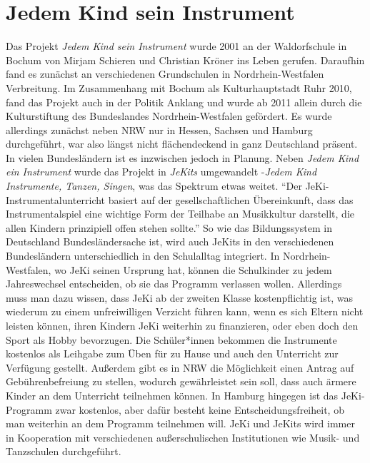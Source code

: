 \section{Jedem Kind sein Instrument}

Das Projekt \emph{Jedem Kind sein Instrument} wurde 2001 an der Waldorfschule in
Bochum von Mirjam Schieren und Christian Kröner ins Leben gerufen. Daraufhin
fand es zunächst an verschiedenen Grundschulen in Nordrhein-Westfalen
Verbreitung. Im Zusammenhang mit Bochum als Kulturhauptstadt Ruhr 2010, fand das
Projekt auch in der Politik Anklang und wurde ab 2011 allein durch die
Kulturstiftung des Bundeslandes Nordrhein-Westfalen gefördert. Es wurde
allerdings zunächst neben NRW nur in Hessen, Sachsen und Hamburg durchgeführt,
war also längst nicht flächendeckend in ganz Deutschland präsent. In vielen
Bundesländern ist es inzwischen jedoch in Planung. Neben \emph{Jedem Kind ein
Instrument} wurde das Projekt in \emph{JeKits} umgewandelt -\emph{Jedem Kind
Instrumente, Tanzen, Singen}, was das Spektrum etwas weitet. \enquote{Der
JeKi-Instrumentalunterricht basiert auf der gesellschaftlichen Übereinkunft,
dass das Instrumentalspiel eine wichtige Form der Teilhabe an Musikkultur
darstellt, die allen Kindern prinzipiell offen stehen
sollte.}\autocite[94]{krupp_schleussner:jeki} So wie das Bildungssystem in
Deutschland Bundesländersache ist, wird auch JeKits in den verschiedenen
Bundesländern unterschiedlich in den Schulalltag integriert. In
Nordrhein-Westfalen, wo JeKi seinen Ursprung hat, können die Schulkinder zu
jedem Jahreswechsel entscheiden, ob sie das Programm verlassen wollen.
\autocite[95]{krupp_schleussner:jeki} Allerdings muss man dazu wissen, dass JeKi
ab der zweiten Klasse kostenpflichtig ist, was wiederum zu einem unfreiwilligen
Verzicht führen kann, wenn es sich Eltern nicht leisten können, ihren Kindern
JeKi weiterhin zu finanzieren, oder eben doch den Sport als Hobby bevorzugen.
Die Schüler*innen bekommen die Instrumente kostenlos als Leihgabe zum Üben für
zu Hause und auch den Unterricht zur Verfügung gestellt. Außerdem gibt es in NRW
die Möglichkeit einen Antrag auf Gebührenbefreiung zu stellen, wodurch
gewährleistet sein soll, dass auch ärmere Kinder an dem Unterricht teilnehmen
können. In Hamburg hingegen ist das JeKi-Programm zwar kostenlos, aber dafür
besteht keine Entscheidungsfreiheit, ob man weiterhin an dem Programm teilnehmen
will.
\autocite[95]{krupp_schleussner:jeki}
JeKi und JeKits wird immer in Kooperation mit verschiedenen außerschulischen
Institutionen wie Musik- und Tanzschulen durchgeführt.

